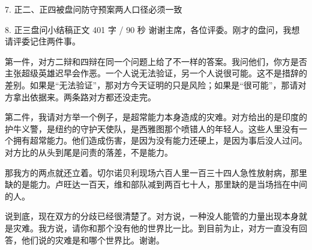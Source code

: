 \documentclass[script,pro]{debate}
\begin{document}
\begin{stage}{7. 正二、正四被盘问防守预案}{两人口径必须一致}
\begin{qaa}
\end{qaa}
\end{stage}
\begin{speech}{8. 正三盘问小结稿}{正文 401 字 / 90 秒}
谢谢主席，各位评委。刚才的盘问，我想请评委记住两件事。

第一件，对方二辩和四辩在同一个问题上给了不一样的答案。我问他们，你方是否主张超级英雄迟早会作恶。一个人说无法验证，另一个人说很可能。这不是措辞的差别。如果是“无法验证”，那对方今天证明的只是风险；如果是“很可能”，那请对方拿出依据来。两条路对方都还没走完。

第二件，我请对方举一个例子，是超常能力本身造成的灾难。对方给出的是印度的护牛义警，是纽约的守护天使队，是西雅图那个喷错人的年轻人。这些人里没有一个拥有超常能力。他们造成伤害，是因为没有能力还硬上，是因为事后没人过问。对方比的从头到尾是问责的落差，不是能力。

那我方的两点就还立着。切尔诺贝利现场六百人里一百三十四人急性放射病，那里缺的是能力。卢旺达一百天，维和部队减到两百七十人，那里缺的是当场挡在中间的人。

说到底，现在双方的分歧已经很清楚了。对方说，一种没人能管的力量出现本身就是灾难。我方说，请你和那个没有他的世界比一比。到目前为止，对方一直没有回答，他们说的灾难是和哪个世界比。谢谢。

\begin{contingency}
\end{contingency}
\end{speech}
\end{document}
